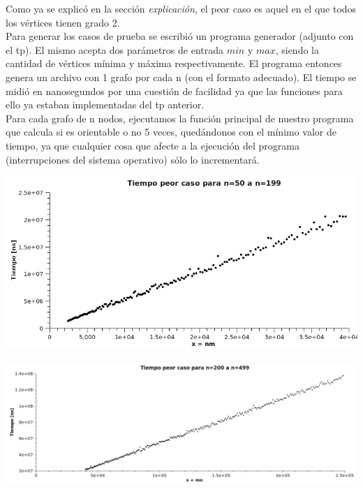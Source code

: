 Como ya se explicó en la sección \textit{explicación}, el peor caso es aquel en el que todos los vértices tienen grado 2.\\
Para generar los casos de prueba se escribió un programa generador (adjunto con el tp). El mismo acepta dos parámetros de entrada $min$ y $max$, siendo la cantidad de vértices mínima y 
máxima respectivamente. El programa entonces genera un archivo con 1 grafo por cada n (con el formato adecuado). El tiempo se midió en nanosegundos por una cuestión de facilidad ya que 
las funciones para ello ya estaban implementadas del tp anterior.\\
Para cada grafo de n nodos, ejecutamos la función principal de nuestro programa que calcula si es orientable o no 5 veces, quedándonos con el mínimo valor de tiempo, ya que cualquier 
cosa que afecte a la ejecución del programa (interrupciones del sistema operativo) sólo lo incrementará.\\

\begin{center}
\includegraphics[scale=0.7]{img/ej2/tiempos2.png} 
\end{center}
\begin{center}
 \includegraphics[scale=0.4]{img/ej2/tiempos3.png}
\end{center}

